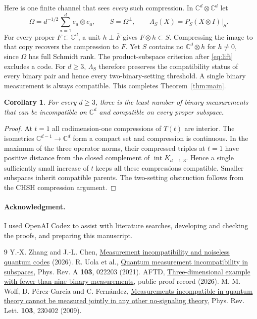 \documentclass[10pt,a4paper]{article}
\newtheorem{corollary}[theorem]{Corollary}
\newcommand{\C}{\mathbb C}
\begin{document}
Here is one finite channel that sees \emph{every} such compression. In \(\C^d\otimes\C^d\) let
\[
 \Omega=d^{-1/2}\sum_{a=1}^d e_a\otimes e_a,\qquad S=\Omega^\perp,
 \qquad \Lambda_S(X)=P_S(X\otimes I)|_S .
\]
For every proper \(F\subset\C^d\), a unit \(h\perp\overline F\) gives \(F\otimes h\subset S\). Compressing the image to that copy recovers the compression to \(F\). Yet \(S\) contains no \(\C^d\otimes h\) for \(h\ne0\), since \(\Omega\) has full Schmidt rank. The product-subspace criterion after \eqref{eq:lift} excludes a code. For \(d\ge3\), \(\Lambda_S\) therefore preserves the compatibility status of every binary pair and hence every two-binary-setting threshold. A single binary measurement is always compatible. This completes Theorem~\ref{thm:main}.

\begin{corollary}
For every \(d\ge3\), three is the least number of binary measurements that can be incompatible on \(\C^d\) and compatible on every proper subspace.
\end{corollary}
\begin{proof}
At \(t=1\) all codimension-one compressions of \(T(t)\) are interior. The isometries \(\C^{d-1}\to\C^d\) form a compact set and compression is continuous. In the maximum of the three operator norms, their compressed triples at \(t=1\) have positive distance from the closed complement of \(\operatorname{int}K_{d-1,3}\). Hence a single sufficiently small increase of \(t\) keeps all these compressions compatible. Smaller subspaces inherit compatible parents. The two-setting obstruction follows from the CHSH compression argument.
\end{proof}

\paragraph{Acknowledgment.} I used OpenAI Codex to assist with literature searches, developing and checking the proofs, and preparing this manuscript.

\small
\begin{thebibliography}{9}
 Y.-X. Zhang and J.-L. Chen, \href{https://arxiv.org/abs/2610.37347}{Measurement incompatibility and noiseless quantum codes} (2026).
 R. Uola et al., \href{https://doi.org/10.1103/PhysRevA.103.022203}{Quantum measurement incompatibility in subspaces}, Phys. Rev. A \textbf{103}, 022203 (2021).
 AFTD, \href{https://rainwangphy.github.io/aftd-platform/d/open_problem_693_three_dim_fewer_than_nine/}{Three-dimensional example with fewer than nine binary measurements}, public proof record (2026).
 M. M. Wolf, D. P\'erez-Garc\'ia and C. Fern\'andez, \href{https://doi.org/10.1103/PhysRevLett.103.230402}{Measurements incompatible in quantum theory cannot be measured jointly in any other no-signaling theory}, Phys. Rev. Lett. \textbf{103}, 230402 (2009).
\end{thebibliography}
\end{document}
